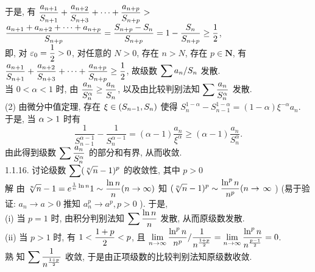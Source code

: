 \documentclass[a4paper,11pt,UTF8]{article}
\begin{document}
 于是, 有 $\displaystyle \displaystyle \displaystyle \frac{a_{n+1}}{S_{n+1}}+\frac{a_{n+2}}{S_{n+3}}+\cdots+\frac{a_{n+p}}{S_{n+p}}>$ $\displaystyle \displaystyle \displaystyle \frac{a_{n+1}+a_{n+2}+\cdots+a_{n+p}}{S_{n+p}}=\frac{S_{n+p}-S_n}{S_{n+p}}=1-\frac{S_n}{S_{n+p}} \geq \frac{1}{2}$,\\
  即, 对 $\displaystyle \displaystyle \displaystyle \varepsilon_0=\frac{1}{2}>0$, 对任意的 $N>0$, 存在 $n>N$, 存在 $p \in \mathbf{N}$, 有 $\displaystyle \displaystyle \displaystyle \frac{a_{n+1}}{S_{n+1}}+\frac{a_{n+2}}{S_{n+3}}+\cdots+\frac{a_{n+p}}{S_{n+p}} \geq \frac{1}{2}$, 故级数 $\displaystyle \displaystyle \displaystyle \sum a_n / S_n$ 发散.\\
当 $0<\alpha<1$ 时, 由 $\displaystyle \displaystyle \displaystyle \frac{a_n}{S_n^\alpha} \geq \frac{a_n}{S_n}$, 以及由比较判别法知 $\displaystyle \displaystyle \displaystyle \sum \frac{a_n}{S_n^\alpha}$ 发散.\\
(2) 由微分中值定理, 存在 $\displaystyle \displaystyle \displaystyle \xi \in\left(S_{n-1}, S_n\right)$ 使得 $S_n^{1-\alpha}-S_{n-1}^{1-\alpha}=(1-\alpha) \xi^{-\alpha} a_n$. 于是, 当 $\displaystyle \displaystyle \displaystyle \alpha>1$ 时有
$$
\frac{1}{S_{n-1}^{\alpha-1}}-\frac{1}{S_n^{\alpha-1}}=(\alpha-1) \frac{a_n}{\xi^\alpha} \geq(\alpha-1) \frac{a_n}{S_n^\alpha} .
$$
由此得到级数 $\displaystyle \displaystyle \displaystyle \sum \frac{a_n}{S_n^\alpha}$ 的部分和有界, 从而收敛.\\
1.1.16. 讨论级数 $\displaystyle \displaystyle \displaystyle \sum(\sqrt[n]{n}-1)^p$ 的收敛性, 其中 $p>0$\\
解 由 $\displaystyle \displaystyle \displaystyle \sqrt[n]{n}-1=e^{\frac{1}{n} \ln n}\-1 \sim \frac{\ln n}{n}(n \rightarrow \infty)$ 知 $\displaystyle \displaystyle \displaystyle (\sqrt[n]{n}-1)^p \sim \frac{\ln ^p n}{n^p}(n \rightarrow$ $\displaystyle \displaystyle \displaystyle \infty$ ) (易于验证: $a_n \rightarrow a>0$ 推知 $a_n^p \rightarrow a^p, p>0$ ). 于是,\\
(i) 当 $p=1$ 时, 由积分判别法知 $\displaystyle \displaystyle \displaystyle \sum \frac{\ln n}{n}$ 发散, 从而原级数发散.\\
(ii) 当 $p>1$ 时, 有 $\displaystyle \displaystyle \displaystyle 1<\frac{1+p}{2}<p$, 且 $\displaystyle \displaystyle \displaystyle \lim _{n \rightarrow \infty} \frac{\ln ^p n}{n^p} / \frac{1}{n^{\frac{1+p}{2}}}=\lim _{n \rightarrow \infty} \frac{\ln ^p n}{n^{\frac{p-1}{2}}}=0$. \\
熟 知 $\displaystyle \displaystyle \displaystyle \sum \frac{1}{n^{\frac{1+p}{2}}}$ 收敛, 于是由正项级数的比较判别法知原级数收敛.\\
\end{document}
